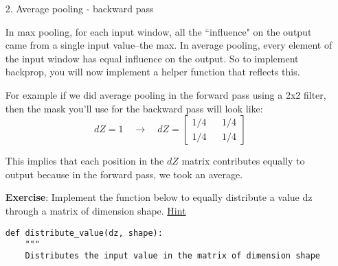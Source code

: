 {\begin{itemize}
\begin{verbatim}
    Returns:
    mask -- Array of the same shape as window, contains a True at the position corresponding to the max entry of x.
    """
    
    ### START CODE HERE ### (≈1 line)
    mask = (x == np.max(x))
    ### END CODE HERE ###
    
    return mask
\end{verbatim}

\begin{verbatim}
np.random.seed(1)
x = np.random.randn(2,3)
mask = create_mask_from_window(x)
print('x = ', x)
print("mask = ", mask)

#output
x =  [[ 1.62434536 -0.61175641 -0.52817175]
 [-1.07296862  0.86540763 -2.3015387 ]]
mask =  [[ True False False]
 [False False False]]
\end{verbatim}

Why do we keep track of the position of the max? It's because this is the input value that ultimately influenced the output, and therefore the cost. Backprop is computing gradients with respect to the cost, so anything that influences the ultimate cost should have a non-zero gradient. So, backprop will ``propagate" the gradient back to this particular input value that had influenced the cost.


\item[2.] Average pooling - backward pass 

In max pooling, for each input window, all the ``influence" on the output came from a single input value--the max. In average pooling, every element of the input window has equal influence on the output. So to implement backprop, you will now implement a helper function that reflects this.

For example if we did average pooling in the forward pass using a 2x2 filter, then the mask you'll use for the backward pass will look like: 
\begin{equation}
dZ = 1 \quad \rightarrow  \quad dZ =\begin{bmatrix}
1/4 && 1/4 \\
1/4 && 1/4
\end{bmatrix}
\end{equation}

This implies that each position in the $dZ$ matrix contributes equally to output because in the forward pass, we took an average. 

{\textbf{Exercise}}: Implement the function below to equally distribute a value dz through a matrix of dimension shape. \href{https://docs.scipy.org/doc/numpy-1.13.0/reference/generated/numpy.ones.html}{Hint}
\begin{verbatim}
def distribute_value(dz, shape):
    """
    Distributes the input value in the matrix of dimension shape
    

\end{verbatim}
\end{itemize}}

